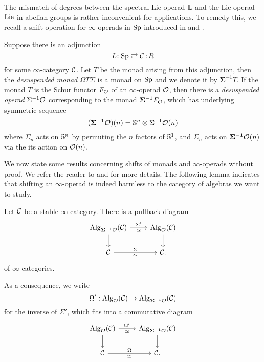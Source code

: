 The mismatch of degrees between the spectral Lie operad ${\mathbb{L}}$ and the Lie operad $\operatorname{Lie}$ in abelian groups is rather inconvenient for applications. To remedy this, we recall a shift operation for $\infty$-operads in $\operatorname{Sp}$ introduced in \cite[\S 2.2.4.]{Hadrianphdthesis} and \cite[Section 3]{Camarena_mod2_free_spectral_Lie_algebra}.
\begin{definition}
    Suppose there is an adjunction
    $$L\negmedspace: \operatorname{Sp}\rightleftarrows {\mathcal{C}}:\negmedspace R$$
    for some $\infty$-category ${\mathcal{C}}$. Let $T$ be the monad arising from this adjunction, then the \emph{desuspended monad} $\Omega T \Sigma$ is a monad on $\operatorname{Sp}$ and we denote it by
     $\mathbf{\Sigma}^{-1}  T$.
	If the monad $T$ is the Schur functor $F_{{\mathcal{O}}}$ of an $\infty$-operad ${\mathcal{O}}$, then there is a \emph{desuspended operad} $\Sigma^{-1}{\mathcal{O}}$ corresponding to the monad $\mathbf{\Sigma}^{-1} F_{{\mathcal{O}}}$, which has underlying symmetric sequence 
	$$
	(\mathbf{\Sigma^{-1}} {\mathcal{O}} ) (n)= {\mathbb{S}}^{n}\otimes\Sigma^{-1} {\mathcal{O}}(n)
	$$
	where $\Sigma_n$ acts on ${\mathbb{S}}^{n}$ by permuting the $n$ factors of ${\mathbb{S}}^{1}$, and $\Sigma_n$ acts on $\mathbf{\Sigma^{-1}} {\mathcal{O}}(n)$ via the its action on ${\mathcal{O}}(n)$.
\end{definition}

We now state some results concerning shifts of monads and $\infty$-operads without proof. We refer the reader to \cite[Section 2.2.4.]{Hadrianphdthesis} and \cite{Camarena_mod2_free_spectral_Lie_algebra} for more details.
The following lemma indicates that shifting an $\infty$-operad is indeed harmless to the category of algebras we want to study.
\begin{lemma}
\cite[Section 2.2.4.]{Hadrianphdthesis}
\label{Shift has no harm}
Let ${\mathcal{C}}$ be a stable $\infty$-category.
There is a pullback diagram
\[
    \begin{tikzcd}
	\Alg_{\bf{\Sigma}^{-1} \CO }(\CC)    & \Alg_{\CO}(\CC) \\
	 \CC & \CC
	\arrow[from=1-1, to = 1-2, "\Sigma'", "\simeq" below]
	\arrow[from=1-1 , to =2-1,  left]
	\arrow[from=1-2 , to =2-2,  right]
	\arrow[from=2-1, to=2-2, "\Sigma", "\simeq" below].
\end{tikzcd}
\]
of $\infty$-categories.
\end{lemma}
As a consequence, we write  
$$
\Omega':
\operatorname{Alg}_{{\mathcal{O}}}({\mathcal{C}}) \to \operatorname{Alg}_{\bf{\Sigma}^{-1} {\mathcal{O}} }({\mathcal{C}})
$$
for the inverse of $\Sigma'$,
which fits into a commutative diagram
\[
    \begin{tikzcd}
	\Alg_{\CO}(\CC)    & \Alg_{\bf{\Sigma}^{-1} \CO }(\CC) \\
	 \CC & \CC
	\arrow[from=1-1, to = 1-2, "\Omega'", "\simeq" below]
	\arrow[from=1-1 , to =2-1,  left]
	\arrow[from=1-2 , to =2-2,  right]
	\arrow[from=2-1, to=2-2, "\Omega", "\simeq" below].
\end{tikzcd}
\]

